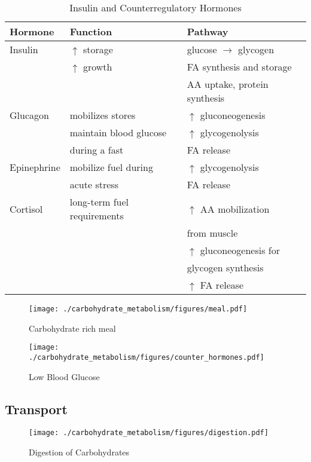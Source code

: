 \documentclass{scrartcl}
\begin{document}
\begin{table}[htbp]
\caption[Insuline and Counterregulatory]{\label{tab:org30ad781}
Insulin and Counterregulatory Hormones}
\centering
\begin{tabular}{lll}
Hormone & Function & Pathway\\
\hline
Insulin & \(\uparrow\) storage & glucose \(\to\) glycogen\\
 & \(\uparrow\) growth & FA synthesis and storage\\
 &  & AA uptake, protein synthesis\\
\hline
Glucagon & mobilizes stores & \(\uparrow\) gluconeogenesis\\
 & maintain blood glucose & \(\uparrow\) glycogenolysis\\
 & during a fast & FA release\\
\hline
Epinephrine & mobilize fuel during & \(\uparrow\) glycogenolysis\\
 & acute stress & FA release\\
\hline
Cortisol & long-term fuel requirements & \(\uparrow\) AA mobilization\\
 &  & from muscle\\
 &  & \(\uparrow\) gluconeogenesis for\\
 &  & glycogen synthesis\\
 &  & \(\uparrow\) FA release\\
\end{tabular}
\end{table}

\begin{figure}[htbp]
\centering
\texttt{[image: ./carbohydrate\_metabolism/figures/meal.pdf]}
\caption{\label{fig:orgbeba5d8}
Carbohydrate rich meal}
\end{figure}

\begin{figure}[htbp]
\centering
\texttt{[image: ./carbohydrate\_metabolism/figures/counter\_hormones.pdf]}
\caption{\label{fig:org0808ac3}
Low Blood Glucose}
\end{figure}

\subsection{Transport}
\label{sec:orgc8e2ebd}
\begin{figure}[htbp]
\centering
\texttt{[image: ./carbohydrate\_metabolism/figures/digestion.pdf]}
\caption{\label{fig:org66d12b6}
Digestion of Carbohydrates}
\end{figure}
\end{document}
